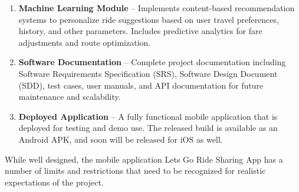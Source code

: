 \begin{enumerate}
    \item \textbf{Machine Learning Module} – Implements content-based recommendation systems to personalize ride suggestions based on user travel preferences, history, and other parameters. Includes predictive analytics for fare adjustments and route optimization.
    
    \item \textbf{Software Documentation} – Complete project documentation including Software Requirements Specification (SRS), Software Design Document (SDD), test cases, user manuals, and API documentation for future maintenance and scalability.

    \item \textbf{Deployed Application} – A fully functional mobile application that is deployed for testing and demo use. The released build is available as an Android APK, and soon will be released for iOS as well.
\end{enumerate}


While well designed, the mobile application Lets Go Ride Sharing App has a number of limits and restrictions that need to be recognized for realistic expectations of the project.

